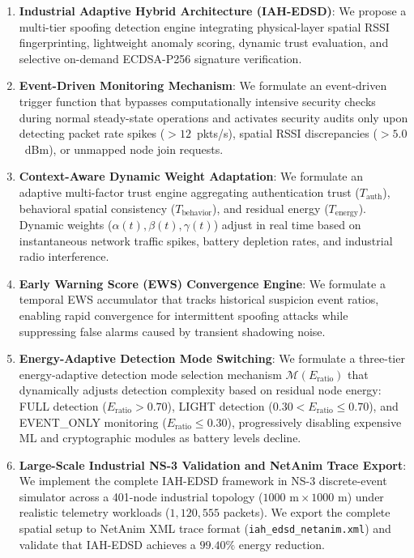 \documentclass[journal]{IEEEtran}
\begin{document}
\begin{enumerate}
    \item \textbf{Industrial Adaptive Hybrid Architecture (IAH-EDSD)}: We propose a multi-tier spoofing detection engine integrating physical-layer spatial RSSI fingerprinting, lightweight anomaly scoring, dynamic trust evaluation, and selective on-demand ECDSA-P256 signature verification.
    \item \textbf{Event-Driven Monitoring Mechanism}: We formulate an event-driven trigger function that bypasses computationally intensive security checks during normal steady-state operations and activates security audits only upon detecting packet rate spikes ($>12$~pkts/s), spatial RSSI discrepancies ($>5.0$~dBm), or unmapped node join requests.
    \item \textbf{Context-Aware Dynamic Weight Adaptation}: We formulate an adaptive multi-factor trust engine aggregating authentication trust ($T_{\text{auth}}$), behavioral spatial consistency ($T_{\text{behavior}}$), and residual energy ($T_{\text{energy}}$). Dynamic weights ($\alpha(t), \beta(t), \gamma(t)$) adjust in real time based on instantaneous network traffic spikes, battery depletion rates, and industrial radio interference.
    \item \textbf{Early Warning Score (EWS) Convergence Engine}: We formulate a temporal EWS accumulator that tracks historical suspicion event ratios, enabling rapid convergence for intermittent spoofing attacks while suppressing false alarms caused by transient shadowing noise.
    \item \textbf{Energy-Adaptive Detection Mode Switching}: We formulate a three-tier energy-adaptive detection mode selection mechanism $\mathcal{M}(E_{\text{ratio}})$ that dynamically adjusts detection complexity based on residual node energy: FULL detection ($E_{\text{ratio}} > 0.70$), LIGHT detection ($0.30 < E_{\text{ratio}} \leq 0.70$), and EVENT\_ONLY monitoring ($E_{\text{ratio}} \leq 0.30$), progressively disabling expensive ML and cryptographic modules as battery levels decline.
    \item \textbf{Large-Scale Industrial NS-3 Validation and NetAnim Trace Export}: We implement the complete IAH-EDSD framework in NS-3 discrete-event simulator across a 401-node industrial topology ($1000\text{ m} \times 1000\text{ m}$) under realistic telemetry workloads ($1,120,555$ packets). We export the complete spatial setup to NetAnim XML trace format (\texttt{iah\_edsd\_netanim.xml}) and validate that IAH-EDSD achieves a $99.40\%$ energy reduction.
\end{enumerate}
\end{document}
